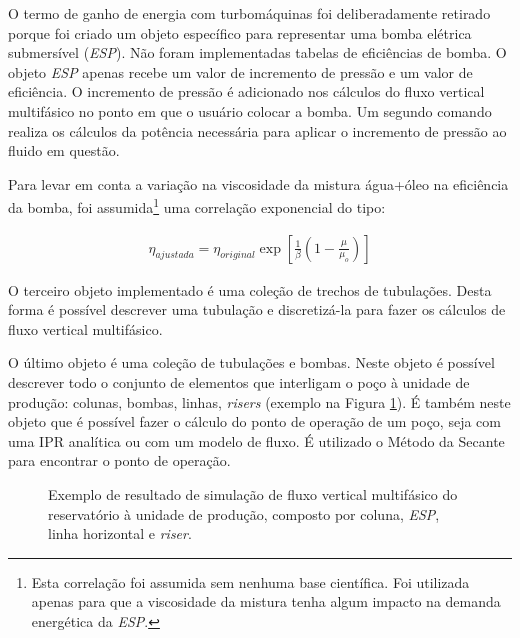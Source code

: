 \documentclass[final,5p]{elsarticle}
\numberwithin{equation}{section}
\begin{document}
        O termo de ganho de energia com turbomáquinas foi deliberadamente retirado porque foi criado um objeto específico para representar uma bomba elétrica submersível (\emph{ESP}). Não foram implementadas tabelas de eficiências de bomba. O objeto \emph{ESP} apenas recebe um valor de incremento de pressão e um valor de eficiência. O incremento de pressão é adicionado nos cálculos do fluxo vertical multifásico no ponto em que o usuário colocar a bomba. Um segundo comando realiza os cálculos da potência necessária para aplicar o incremento de pressão ao fluido em questão.

        Para levar em conta a variação na viscosidade da mistura água+óleo na eficiência da bomba, foi assumida\footnote{Esta correlação foi assumida sem nenhuma base científica. Foi utilizada apenas para que a viscosidade da mistura tenha algum impacto na demanda energética da \emph{ESP}.} uma correlação exponencial do tipo:

        \begin{align}
            \eta_{ajustada} = \eta_{original} \exp \left[\frac{1}{\beta}\left(1-\frac{\mu}{\mu_o}\right) \right]
        \end{align}

        O terceiro objeto implementado é uma coleção de trechos de tubulações. Desta forma é possível descrever uma tubulação e discretizá-la para fazer os cálculos de fluxo vertical multifásico.

        O último objeto é uma coleção de tubulações e bombas. Neste objeto é possível descrever todo o conjunto de elementos que interligam o poço à unidade de produção: colunas, bombas, linhas, \emph{risers} (exemplo na Figura \ref{fig:flow}). É também neste objeto que é possível fazer o cálculo do ponto de operação de um poço, seja com uma IPR analítica ou com um modelo de fluxo. É utilizado o Método da Secante para encontrar o ponto de operação.

        \begin{figure}[hbt!]
            \caption{Exemplo de resultado de simulação de fluxo vertical multifásico do reservatório à unidade de produção, composto por coluna, \emph{ESP}, linha horizontal e \emph{riser}.}
            \label{fig:flow}
        \end{figure}
\end{document}
